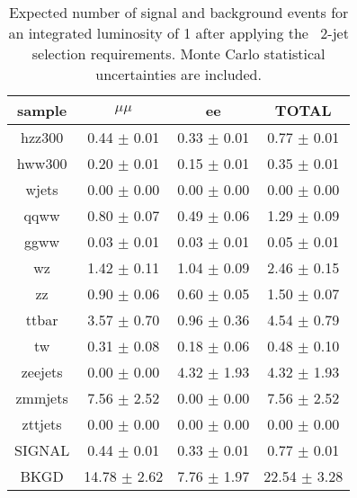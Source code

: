 \begin{table}[!ht]
\begin{center}
\begin{tabular}{c|c|c|c}
\hline
sample    & $\mu\mu$    & ee     & TOTAL\\ \hline 
hzz300   & 0.44 $\pm$ 0.01   & 0.33 $\pm$ 0.01   & 0.77 $\pm$ 0.01 \\ \hline 
hww300   & 0.20 $\pm$ 0.01   & 0.15 $\pm$ 0.01   & 0.35 $\pm$ 0.01 \\ \hline 
wjets   & 0.00 $\pm$ 0.00   & 0.00 $\pm$ 0.00   & 0.00 $\pm$ 0.00 \\ \hline 
qqww   & 0.80 $\pm$ 0.07   & 0.49 $\pm$ 0.06   & 1.29 $\pm$ 0.09 \\ \hline 
ggww   & 0.03 $\pm$ 0.01   & 0.03 $\pm$ 0.01   & 0.05 $\pm$ 0.01 \\ \hline 
wz   & 1.42 $\pm$ 0.11   & 1.04 $\pm$ 0.09   & 2.46 $\pm$ 0.15 \\ \hline 
zz   & 0.90 $\pm$ 0.06   & 0.60 $\pm$ 0.05   & 1.50 $\pm$ 0.07 \\ \hline 
ttbar   & 3.57 $\pm$ 0.70   & 0.96 $\pm$ 0.36   & 4.54 $\pm$ 0.79 \\ \hline 
tw   & 0.31 $\pm$ 0.08   & 0.18 $\pm$ 0.06   & 0.48 $\pm$ 0.10 \\ \hline 
zeejets   & 0.00 $\pm$ 0.00   & 4.32 $\pm$ 1.93   & 4.32 $\pm$ 1.93 \\ \hline 
zmmjets   & 7.56 $\pm$ 2.52   & 0.00 $\pm$ 0.00   & 7.56 $\pm$ 2.52 \\ \hline 
zttjets   & 0.00 $\pm$ 0.00   & 0.00 $\pm$ 0.00   & 0.00 $\pm$ 0.00 \\ \hline 
SIGNAL   & 0.44 $\pm$ 0.01   & 0.33 $\pm$ 0.01   & 0.77 $\pm$ 0.01 \\ \hline 
BKGD   & 14.78 $\pm$ 2.62   & 7.76 $\pm$ 1.97   & 22.54 $\pm$ 3.28 \\ \hline 
\end{tabular}
\caption{\fixme{}Expected number of signal and background events for an 
  integrated luminosity of 1\ifb{} after applying the \zz\ 
  2-jet selection requirements. Monte Carlo statistical 
  uncertainties are included.}
\label{tab:mcyield_zzsel_2j}
\end{center}
\end{table}
